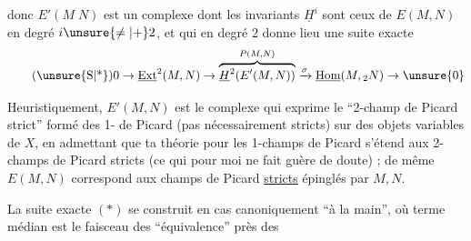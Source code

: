 \margin{\mbox{-- --}}

donc $E'(M\;N)$ est un complexe dont les invariants $\underline{H}^{i}$ sont ceux de $E(M,N)$ en degré $i\unsure{\ne|+}2$, et qui en degré $2$ donne lieu  une suite exacte
\begingroup
\makeatletter\tagsleft@true\makeatother
\[
\tag*{(\unsure{S|*})}
0\to\underline{\mathrm{Ext}}^{2}(M,N)\to
\overbrace{\underline{H}^{2}\!\left(E'(M,N)\right)}^{P(M,N)}
\xrightarrow{\sigma}\underline{\mathrm{Hom}}(M,{}_{2}N)\to \unsure{0}
\]
\endgroup

Heuristiquement, $E'(M,N)$ est le complexe qui exprime le ``2-champ de Picard strict'' formé des 1- de Picard (pas nécessairement stricts)  sur des objets variables de $X$, en admettant que ta théorie pour les 1-champs de Picard  s'étend aux 2-champs de Picard stricts (ce qui pour \unsure{,} moi ne fait guère de doute) ; de même $E(M,N)$ correspond aux champs de Picard \uline{stricts} épinglés par $M,N$.

La suite exacte $(*)$ se construit en  cas canoniquement ``à la main'', où  terme médian est le faisceau des   ``équivalence'' près des

